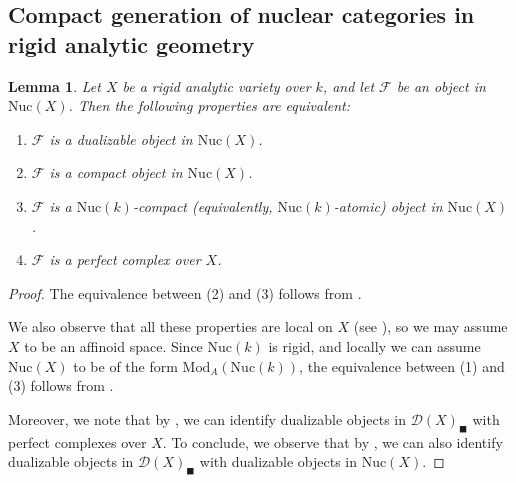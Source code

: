 \documentclass[oneside, hidelinks, 12pt, a4paper,reqno]{amsart}
\theoremstyle{plain}
\theoremstyle{definition}
\theoremstyle{plain}
\newtheorem{lemma}[lemma]{Lemma}
\newcommand{\cD}{\mathscr D}
\newcommand{\cF}{\mathscr F}
\newcommand{\Nuc}{\mathrm{Nuc}}
\newcommand{\Mod}{\mathrm{Mod}}
\newcommand{\Solid}{\blacksquare}
\begin{document}
\subsection{Compact generation of nuclear categories in rigid analytic geometry}

\begin{lemma}\label{lem: perfect complexes over rigid varieties}
    Let $X$ be a rigid analytic variety over $k$, and let $\cF$ be an object in $\Nuc(X)$. Then the following properties are equivalent:
    \begin{enumerate}
        \item $\cF$ is a dualizable object in $\Nuc(X)$.
        \item $\cF$ is a compact object in $\Nuc(X)$.
        \item $\cF$ is a $\Nuc(k)$-compact (equivalently, $\Nuc(k)$-atomic) object in $\Nuc(X)$.
        \item $\cF$ is a perfect complex over $X$.
    \end{enumerate}
\end{lemma}
\begin{proof} 
    The equivalence between (2) and (3) follows from .

    We also observe that all these properties are local on $X$ (see \cite{andreychev2021pseudocoherent}), so we may assume $X$ to be an affinoid space. Since $\Nuc(k)$ is rigid, and locally we can assume $\Nuc(X)$ to be of the form $\Mod_{A}(\Nuc(k))$, the equivalence between (1) and (3) follows from . 
    
    Moreover, we note that by \cite[Corollary 5.51.1]{andreychev2021pseudocoherent}, we can identify dualizable objects in $\cD(X)_\Solid$ with perfect complexes over $X$. To conclude, we observe that by \cite[Lemma 5.45 and Theorem 5.50]{andreychev2021pseudocoherent}, we can also identify dualizable objects in $\cD(X)_\Solid$ with dualizable objects in $\Nuc(X)$. 
\end{proof}
\end{document}
